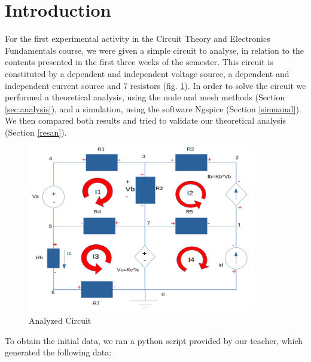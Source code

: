 \documentclass[11en, a4paper, oneside]{article}
\begin{document}
\newpage
\renewcommand{\contentsname}{Índice}
\tableofcontents
\thispagestyle{empty}

\newpage
{}
\setcounter{page}{3}

\section{Introduction}

For the first experimental activity in the Circuit Theory and Electronics Fundamentals course, we were given a simple circuit to analyse, in relation to the contents presented in the first three weeks of the semester.
This circuit is constituted by a dependent and independent voltage source, a dependent and independent current source and 7 resistors (fig. \ref{intro}).
In order to solve the circuit we performed a theoretical analysis, using the node and mesh methods (Section \ref{sec:analysis}), and a simulation, using the software Ngspice (Section \ref{simuanal}). We then compared both results and tried to validate our theoretical analysis (Section \ref{resan}).

\begin{figure}[htb!]
			\begin{center}
				\includegraphics[width=10cm]{Intro.png}
				\caption{Analyzed Circuit}
				\label{intro}
			\end{center}
\end{figure}

To obtain the initial data, we ran a python script provided by our teacher, which generated the following data:\\
\end{document}
